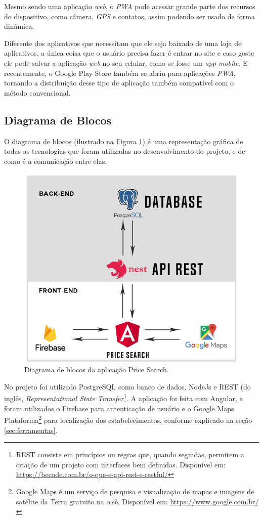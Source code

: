 Mesmo sendo uma aplicação \textit{web}, o \textit{PWA} pode acessar grande parte dos recursos do dispositivo, como câmera, \textit{GPS} e contatos, assim podendo ser usado de forma dinâmica.

Diferente dos aplicativos que necessitam que ele seja baixado de uma loja de aplicativos, a única coisa que o usuário precisa fazer é entrar no site e caso goste ele pode salvar a aplicação \textit{web} no seu celular, como se fosse um \textit{app mobile}. E recentemente, o Google Play Store também se abriu para aplicações \textit{PWA}, tornando a distribuição desse tipo de aplicação também compatível com o método convencional.


\subsection{Diagrama de Blocos}

 O diagrama de blocos (ilustrado na Figura  \ref{fig:diagrama_de_blocos}) é uma representação gráfica de todas as tecnologias que foram utilizadas no desenvolvimento do projeto, e de como é a comunicação entre elas.
 
\begin{figure}[!htb]
\centering
\includegraphics[width=\linewidth]{figuras/diagrama_de_blocos.png}
\caption{Diagrama de blocos da aplicação Price Search.}
\label{fig:diagrama_de_blocos}
\end{figure}
 
 No projeto foi utilizado PostgreSQL como banco de dados, NodeJs e REST (do inglês, \textit{Representational State Transfer}\footnote{REST consiste em princípios ou regras que, quando seguidas, permitem a criação de um projeto com interfaces bem definidas. Disponível em: \url{https://becode.com.br/o-que-e-api-rest-e-restful/}}. A aplicação foi feita com Angular, e foram utilizados o Firebase para autenticação de usuário e o Google Maps Plataforma\footnote{Google Maps é um serviço de pesquisa e visualização de mapas e imagens de satélite da Terra gratuito na \textit{web}. Disponível em: \url{https://www.google.com.br/}} para localização dos estabelecimentos, conforme explicado na seção \ref{sec:ferramentas}.
 
